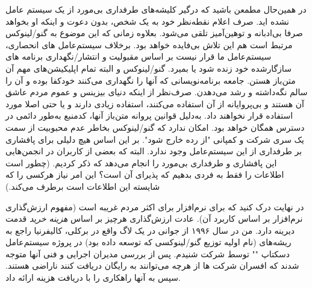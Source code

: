در همین‌حال مطمعن باشید که درگیر کلیشه‌های طرفداری بی‌مورد از یک سیستم عامل نشده اید.
صرف اعلام نقطه‌نظر خود به یک شخص، بدون دعوت و اینکه او بخواهد صرفا بی‌ادبانه و توهین‌آمیز
تلقی می‌شود. بعلاوه زمانی‌ که این موضوع به گنو/لینوکس مرتبط است هم این تلاش بی‌فایده خواهد بود.
برخلاف سیستم‌عامل های انحصاری، سیستم‌عامل ما قرار نیست بر اساس مقبولیت و انتشار/نگهداری
برنامه های سازگارشده خود زنده شود یا بمیرد.
گنو/لینوکس و البته تمام اپلیکیشن‌های مهم آن متن‌باز هستن. جامعه برنامه‌نویسانی که آنها
را نگهداری می‌کنند خودکفا بوده و آن را سالم نگه‌داشته و رشد می‌دهدن.
صرف‌نظر از اینکه دنیای بیزینس و عموم مردم عاشق آن هستند و بی‌پروایانه از آن استفاده می‌کنند،
استفاده زیادی دارند و یا حتی اصلا مورد استفاده قرار نخواهند داد.
به‌دلیل قوانین پروانه متن‌باز آنها، کدمنبع به‌طور دائمی در دسترس همگان خواهد بود.
امکان ندارد که گنو/لینوکس بخاطر عدم محبوبیت از سمت یک سری شرکت و کمپانی
"از رده خارج شود". بر این اساس هیچ دلیلی برای پافشاری بر طرفداری از این سیستم‌عامل
وجود ندارد. البته که بعضی از کاربران در انجمن‌هایی این پافشاری و طرفداری بی‌مورد را
انجام می‌دهد که ذکر کردیم. (چطور است اطلاعات را فقط به فردی بدهیم که پذیرای آن است؟
این امر نیاز هرکسی را که شایسته این اطلاعات است برطرف می‌کند.)

در نهایت درک کنید که
برای نرم‌افزار برای اکثر مردم غریبه است (مفهوم ارزش‌گذاری نرم‌افزار بر اساس کاربرد آن).
عادت ارزش‌گذاری هرچیز بر اساس
{\itshape هزینه خرید}
قدمت دیرینه دارد.
من در سال ۱۹۹۶ از جوانی در یک لاگ واقع در برکلی، کالیفرنیا راجع به ریشه‌های
(نام اولیه توزیع گنو/لینوکسی که توسعه داده بود) در پروژه
سیستم‌عامل دسکتاپ "" توسط شرکت  شنیدم.
پس از بررسی مدیران اجرایی و فنی آنها متوجه شدند که افسران شرکت ها
از هرچه می‌توانند به رایگان دریافت کنند ناراضی هستند. سپس 
به آنها راهکاری را با دریافت هزینه ارائه داد.

